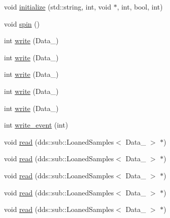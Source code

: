 \begin{DoxyCompactItemize}
\item 
void \hyperlink{classProcessingBlock_aebc4e7e31d10802eaa6d9341cc28f09b}{initialize} (std\+::string, int, void $\ast$, int, bool, int)
\item 
void \hyperlink{classProcessingBlock_a36e353e417f3fe482492f6166c504a71}{spin} ()
\item 
int \hyperlink{classProcessingBlock_a8d0f41fb6371a35583d36988e3c775a1}{write} (Data\+\_)
\item 
int \hyperlink{classProcessingBlock_a12525c442526e3a65179327eefbc285c}{write} (Data\+\_)
\item 
int \hyperlink{classProcessingBlock_aa5e4574a9c073a7168de88c052f634af}{write} (Data\+\_)
\item 
int \hyperlink{classProcessingBlock_a641e4f0b9cce71f1b8dd0a5fab6d34bb}{write} (Data\+\_)
\item 
int \hyperlink{classProcessingBlock_a7b459f5c8f5bb87f035410cdf6c81dc6}{write} (Data\+\_)
\item 
int \hyperlink{classProcessingBlock_acdbdda9a147f47eb293e258b0d04c2fc}{write\+\_\+event} (int)
\item 
void \hyperlink{classProcessingBlock_ad4d5346c19d8923d2d008293ccab7b02}{read} (dds\+::sub\+::\+Loaned\+Samples$<$ Data\+\_ $>$ $\ast$)
\item 
void \hyperlink{classProcessingBlock_adfd54db201d333b23ea78c466bdf5bb4}{read} (dds\+::sub\+::\+Loaned\+Samples$<$ Data\+\_ $>$ $\ast$)
\item 
void \hyperlink{classProcessingBlock_ae452768d47cbd57657af91d28804c539}{read} (dds\+::sub\+::\+Loaned\+Samples$<$ Data\+\_ $>$ $\ast$)
\item 
void \hyperlink{classProcessingBlock_a0f32c4dbc907eb7304b3a9fa08e34225}{read} (dds\+::sub\+::\+Loaned\+Samples$<$ Data\+\_ $>$ $\ast$)
\item 
void \hyperlink{classProcessingBlock_a44473ec23c6a212bd8ada8bb5d777a08}{read} (dds\+::sub\+::\+Loaned\+Samples$<$ Data\+\_ $>$ $\ast$)
\end{DoxyCompactItemize}

